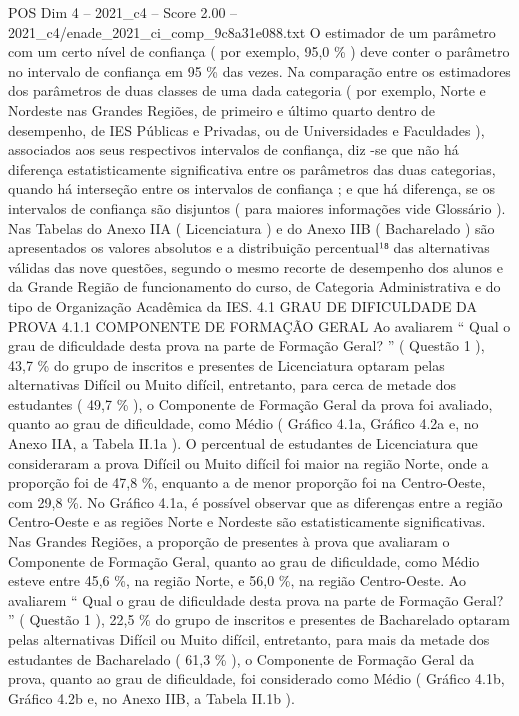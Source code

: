 \begin{textsample}{POS Dim 4 – 2021\_c4 – Score 2.00 – 2021\_c4/enade\_2021\_ci\_comp\_9c8a31e088.txt}
O estimador de um parâmetro com um certo nível de confiança ( por exemplo, 95,0 \% ) deve conter o parâmetro no intervalo de confiança em 95 \% das vezes.
Na comparação entre os estimadores dos parâmetros de duas classes de uma dada categoria ( por exemplo, Norte e Nordeste nas Grandes Regiões, de primeiro e último quarto dentro de desempenho, de IES Públicas e Privadas, ou de Universidades e Faculdades ), associados aos seus respectivos intervalos de confiança, diz -se que não há diferença estatisticamente significativa entre os parâmetros das duas categorias, quando há interseção entre os intervalos de confiança ; e que há diferença, se os intervalos de confiança são disjuntos ( para maiores informações vide Glossário ).
Nas Tabelas do Anexo IIA ( Licenciatura ) e do Anexo IIB ( Bacharelado ) são apresentados os valores absolutos e a distribuição percentual¹⁸ das alternativas válidas das nove questões, segundo o mesmo recorte de desempenho dos alunos e da Grande Região de funcionamento do curso, de Categoria Administrativa e do tipo de Organização Acadêmica da IES. 4.1 GRAU DE DIFICULDADE DA PROVA 4.1.1 COMPONENTE DE FORMAÇÃO GERAL Ao avaliarem “ Qual o grau de dificuldade desta prova na parte de Formação Geral? ” ( Questão 1 ), 43,7 \% do grupo de inscritos e presentes de Licenciatura optaram pelas alternativas Difícil ou Muito difícil, entretanto, para cerca de metade dos estudantes ( 49,7 \% ), o Componente de Formação Geral da prova foi avaliado, quanto ao grau de dificuldade, como Médio ( Gráfico 4.1a, Gráfico 4.2a e, no Anexo IIA, a Tabela II.1a ).
O percentual de estudantes de Licenciatura que consideraram a prova Difícil ou Muito difícil foi maior na região Norte, onde a proporção foi de 47,8 \%, enquanto a de menor proporção foi na Centro-Oeste, com 29,8 \%.
No Gráfico 4.1a, é possível observar que as diferenças entre a região Centro-Oeste e as regiões Norte e Nordeste são estatisticamente significativas.
Nas Grandes Regiões, a proporção de presentes à prova que avaliaram o Componente de Formação Geral, quanto ao grau de dificuldade, como Médio esteve entre 45,6 \%, na região Norte, e 56,0 \%, na região Centro-Oeste.
Ao avaliarem “ Qual o grau de dificuldade desta prova na parte de Formação Geral? ” ( Questão 1 ), 22,5 \% do grupo de inscritos e presentes de Bacharelado optaram pelas alternativas Difícil ou Muito difícil, entretanto, para mais da metade dos estudantes de Bacharelado ( 61,3 \% ), o Componente de Formação Geral da prova, quanto ao grau de dificuldade, foi considerado como Médio ( Gráfico 4.1b, Gráfico 4.2b e, no Anexo IIB, a Tabela II.1b ).

\end{textsample}
